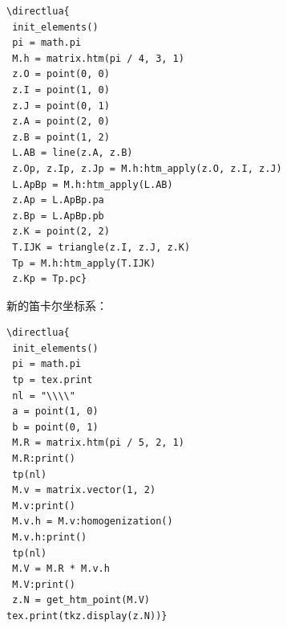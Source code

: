 \begin{minipage}{.6\textwidth}
\begin{verbatim}
\directlua{
 init_elements()
 pi = math.pi
 M.h = matrix.htm(pi / 4, 3, 1)
 z.O = point(0, 0)
 z.I = point(1, 0)
 z.J = point(0, 1)
 z.A = point(2, 0)
 z.B = point(1, 2)
 L.AB = line(z.A, z.B)
 z.Op, z.Ip, z.Jp = M.h:htm_apply(z.O, z.I, z.J)
 L.ApBp = M.h:htm_apply(L.AB)
 z.Ap = L.ApBp.pa
 z.Bp = L.ApBp.pb
 z.K = point(2, 2)
 T.IJK = triangle(z.I, z.J, z.K)
 Tp = M.h:htm_apply(T.IJK)
 z.Kp = Tp.pc}
\end{verbatim}
\end{minipage}
\begin{minipage}{.4\textwidth}
\end{minipage}

\vspace{.5 em}

新的笛卡尔坐标系：

\vspace{.5 em}
\begin{minipage}{.5\textwidth}
\begin{verbatim}
\directlua{
 init_elements()
 pi = math.pi
 tp = tex.print
 nl = "\\\\"
 a = point(1, 0)
 b = point(0, 1)
 M.R = matrix.htm(pi / 5, 2, 1)
 M.R:print()
 tp(nl)
 M.v = matrix.vector(1, 2)
 M.v:print()
 M.v.h = M.v:homogenization()
 M.v.h:print()
 tp(nl)
 M.V = M.R * M.v.h
 M.V:print()
 z.N = get_htm_point(M.V)
tex.print(tkz.display(z.N))}
\end{verbatim}
\end{minipage}
\begin{minipage}{.5\textwidth}
\end{minipage}

